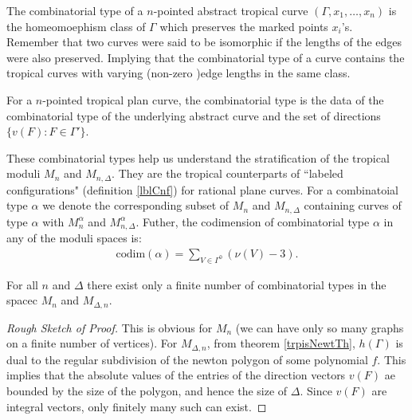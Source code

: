 \begin{definition}
    The combinatorial type of a $n$-pointed abstract tropical curve $(\Gamma, x_{1},\dots, x_{n})$ is the homeomoephism class of $\Gamma$ which preserves the marked points $x_{i}$'s.
    Remember that two curves were said to be isomorphic if the lengths of the edges were also preserved.
    Implying that the combinatorial type of a curve contains the tropical curves with varying (non-zero )edge lengths in the same class.
    \par For a $n$-pointed tropical plan curve, the combinatorial type is the data of the combinatorial type of the underlying abstract curve and the set of directions $\{v(F): F \in \Gamma'\}$.
\end{definition}

These combinatorial types help us understand the stratification of the tropical moduli $M_{n}$ and $M_{n,\Delta}$. 
They are the tropical counterparts of ``labeled configurations" (definition \ref{lblCnf}) for rational plane curves.
For a combinatoial type $\alpha$ we denote the corresponding subset of $M_{n}$ and $M_{n,\Delta}$ containing curves of type $\alpha$ with $M^{\alpha}_{n}$ and $M^{\alpha}_{n,\Delta}$. 
Futher, the codimension of combinatorial type $\alpha$ in any of the moduli spaces is:
\begin{align*}
    \text{codim}(\alpha) = \sum_{V \in \Gamma^{0}} (\nu(V)-3).
\end{align*}

\begin{lemma}
    For all $n$ and $\Delta$ there exist only a finite number of combinatorial types in the spacec $M_{n}$ and $M_{\Delta,n}$.
\end{lemma}
\begin{proof}[Rough Sketch of Proof]
    This is obvious for $M_{n}$ (we can have only so many graphs on a finite number of vertices).
    For $M_{\Delta,n}$, from theorem \ref{trpisNewtTh}, $h(\Gamma)$ is dual to the regular subdivision of the newton polygon of some polynomial $f$.
    This implies that the absolute values of the entries of the direction vectors $v(F)$ ae bounded by the size of the polygon, and hence the size of $\Delta$.
    Since $v(F)$ are integral vectors, only finitely many such can exist.
\end{proof}


